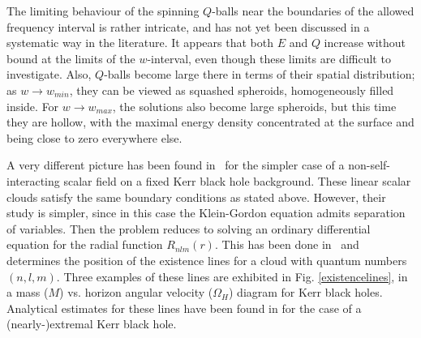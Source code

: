 The limiting behaviour of the spinning $Q$-balls near the boundaries of the allowed frequency interval
is rather intricate, and has not yet been discussed in a systematic way  in the literature. 
It appears that 
both $E$ and $Q$
increase without bound at the limits of the $w$-interval, even though these limits are difficult to investigate.
Also, $Q$-balls become large there in terms of their spatial distribution;
as $w\to w_{min}$,
they can be viewed as squashed spheroids, homogeneously filled inside.
For $w\to w_{max}$, the solutions
also become large spheroids, but this time they are hollow, with the maximal energy density
concentrated at the surface and being close to zero everywhere else.  

\bigskip
  
A very different picture has been found in~\cite{Herdeiro:2014goa,Benone:2014ssa}
for the simpler case of a non-self-interacting
scalar field
on a fixed Kerr black hole background.
These linear scalar clouds
satisfy the same boundary conditions as stated above.
However, their study is  simpler, since in this case
the Klein-Gordon equation admits separation of variables. 
%
Then the problem reduces to solving
an ordinary differential equation for 
the radial function $R_{nlm}(r)$.
This has been done in~\cite{Herdeiro:2014goa,Benone:2014ssa} and determines the position of the existence lines for a cloud with quantum numbers $(n,l,m)$. Three examples of these lines are exhibited in Fig. \ref{existencelines}, in a mass ($M$) vs. horizon angular velocity ($\Omega_H$) diagram for Kerr black holes.
%
Analytical estimates for these lines have been found in 
\cite{Hod:2012px,Hod:2013zza}
for the case of a (nearly-)extremal Kerr black hole.


